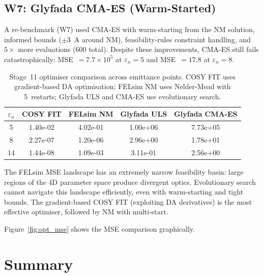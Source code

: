 \documentclass[11pt]{article}
\begin{document}
\subsection{W7: Glyfada CMA-ES (Warm-Started)}

A re-benchmark (W7) used CMA-ES with warm-starting from the NM
solution, informed bounds ($\pm$\SI{3}{A} around NM), feasibility-rules
constraint handling, and $5\times$ more evaluations (600 total).
Despite these improvements, CMA-ES still fails catastrophically:
MSE~$= 7.7 \times 10^5$ at $\varepsilon_n = 5$ and MSE~$= 17.8$ at
$\varepsilon_n = 8$.

\begin{table}[ht]
\centering
\caption{Stage~11 optimiser comparison across emittance points.
  COSY FIT uses gradient-based DA optimisation; FELsim NM uses
  Nelder-Mead with 5~restarts; Glyfada ULS and CMA-ES use
  evolutionary search.}
\label{tab:opt}
\begin{tabular}{@{} c S[scientific-notation=true] S[scientific-notation=true]
  S[scientific-notation=true] S[scientific-notation=true] @{}}
\toprule
{$\varepsilon_n$} & {COSY FIT} & {FELsim NM} & {Glyfada ULS} & {Glyfada CMA-ES} \\
  & 1.40e-02 & 4.02e-01 & 1.00e+06 & 7.73e+05 \\
8  & 2.27e-07 & 1.20e-06 & 2.96e+00 & 1.78e+01 \\
14 & 1.44e-08 & 1.09e-03 & 3.11e-01 & 2.56e+00 \\
\bottomrule
\end{tabular}
\end{table}

The FELsim MSE landscape has an extremely narrow feasibility basin:
large regions of the 4D parameter space produce divergent optics.
Evolutionary search cannot navigate this landscape efficiently, even
with warm-starting and tight bounds.  The gradient-based COSY FIT
(exploiting DA derivatives) is the most effective optimiser, followed
by NM with multi-start.

Figure~\ref{fig:opt_mse} shows the MSE comparison graphically.


\section{Summary}
\end{document}

